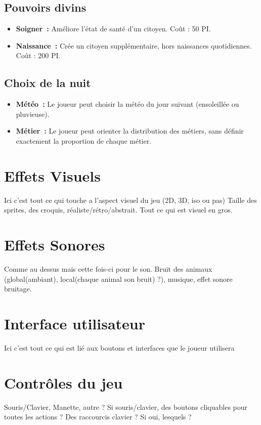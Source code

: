 \documentclass[a4paper]{article}
\begin{document}
\subsection*{Pouvoirs divins}
\begin{itemize}
\item \textbf{Soigner :} \small{ Améliore l'état de santé d'un citoyen. Coût : 50 PI.}
\item \textbf{Naissance :} \small{ Crée un citoyen supplémentaire, hors naissances quotidiennes. Coût : 200 PI.}
\end{itemize}

\subsection*{Choix de la nuit}
\begin{itemize}
\item \textbf{Météo :} \small{ Le joueur peut choisir la météo du jour suivant (ensoleillée ou pluvieuse).}
\item \textbf{Métier :} \small{ Le joueur peut orienter la distribution des métiers, sans définir exactement la proportion de chaque métier.}
\end{itemize}


\section*{Effets Visuels}

Ici c'est tout ce qui touche a l'aspect visuel du jeu (2D, 3D, iso ou pas) Taille des sprites, des croquis, réaliste/rétro/abstrait. Tout ce qui est visuel en gros.

\section*{Effets Sonores}

Comme au dessus mais cette fois-ci pour le son. Bruit des animaux (global(ambiant), local(chaque animal son bruit) ?), musique, effet sonore bruitage.

\section*{Interface utilisateur}

Ici c'est tout ce qui est lié aux boutons et interfaces que le joueur utilisera 

\section*{Contrôles du jeu}

Souris/Clavier, Manette, autre ?
Si souris/clavier, des boutons cliquables pour toutes les actions ? Des raccourcis clavier ? Si oui, lesquels ?
\end{document}
